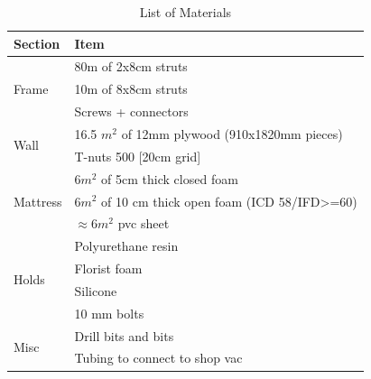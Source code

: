 \documentclass{scrartcl}
\begin{document}
\begin{table}[h]
\centering
\caption{List of Materials}
\begin{tabular}{l l}
\toprule[2pt]
Section & Item\\
\midrule
\multirow{3}{*}{Frame} & 80m of 2x8cm struts \\
	& 10m of 8x8cm struts \\
	& Screws + connectors \\
\midrule
\multirow{2}{*}{Wall} & 16.5 $m^2$ of 12mm plywood (910x1820mm pieces)\\
	& T-nuts 500 [20cm grid] \\
\midrule
\multirow{3}{*}{Mattress} & 6$m^2$ of 5cm thick closed foam\\
	& 6$m^2$ of 10 cm thick open foam (ICD 58/IFD>=60)\\
	& $\approx$6$m^2$ pvc sheet\\
\midrule
\multirow{4}{*}{Holds} & Polyurethane resin\\
	& Florist foam\\
	& Silicone\\
	& 10 mm bolts\\
	\midrule
\multirow{2}{*}{Misc} &  Drill bits and bits\\
	& Tubing to connect to shop vac\\
\bottomrule[2pt]
\end{tabular}
\end{table}
\end{document}
